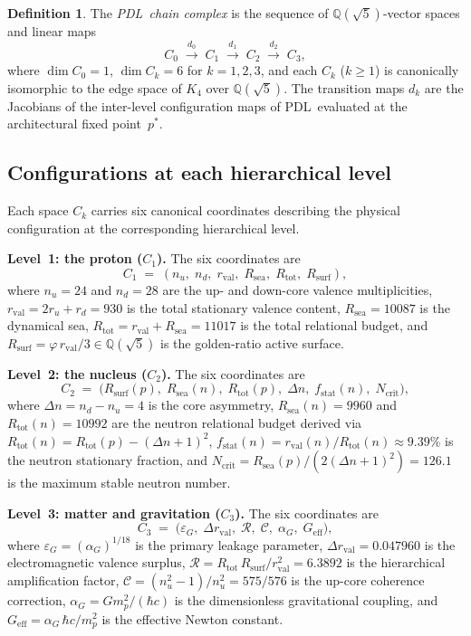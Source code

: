 \documentclass[11pt,a4paper]{article}
\theoremstyle{definition}
\newtheorem{definition}[theorem]{Definition}
\newcommand{\PDL}{\textnormal{PDL}}
\newcommand{\Rsurf}{R_{\mathrm{surf}}}
\newcommand{\Rsea}{R_{\mathrm{sea}}}
\newcommand{\Rtot}{R_{\mathrm{tot}}}
\newcommand{\rval}{r_{\mathrm{val}}}
\newcommand{\epsg}{\varepsilon_G}
\newcommand{\Kfour}{K_4}
\newcommand{\dmap}[1]{d_{#1}}
\newcommand{\calR}{\mathcal{R}}
\newcommand{\calC}{\mathcal{C}}
\newcommand{\vp}{\varphi}
\begin{document}
\begin{definition}
  \label{def:chain_complex}
  The \emph{\PDL\ chain complex} is the sequence of $\mathbb{Q}(\sqrt{5})$-vector spaces and linear maps
  \[
    C_0 \;\xrightarrow{\dmap{0}}\; C_1 \;\xrightarrow{\dmap{1}}\; C_2 \;\xrightarrow{\dmap{2}}\; C_3,
  \]
  where $\dim C_0 = 1$, $\dim C_k = 6$ for $k = 1, 2, 3$, and each $C_k$ ($k \geq 1$) is canonically isomorphic to the edge space of $\Kfour$ over $\mathbb{Q}(\sqrt{5})$. The transition maps $\dmap{k}$ are the Jacobians of the inter-level configuration maps of \PDL\ evaluated at the architectural fixed point~$p^*$.
\end{definition}

\subsection{Configurations at each hierarchical level}
\label{subsec:configs}

Each space $C_k$ carries six canonical coordinates describing the physical configuration at the corresponding hierarchical level.

\medskip\noindent\textbf{Level~1: the proton ($C_1$).} The six coordinates are
\[
  C_1 \;=\; (n_u,\; n_d,\; \rval,\; \Rsea,\; \Rtot,\; \Rsurf),
\]
where $n_u = 24$ and $n_d = 28$ are the up- and down-core valence multiplicities, $\rval = 2r_u + r_d = 930$ is the total stationary valence content, $\Rsea = 10087$ is the dynamical sea, $\Rtot = \rval + \Rsea = 11017$ is the total relational budget, and $\Rsurf = \vp\,\rval/3 \in \mathbb{Q}(\sqrt{5})$ is the golden-ratio active surface.\cite{Combinatorial_Proton_v2_2026,Alpha_PDL_v2_2026}

\medskip\noindent\textbf{Level~2: the nucleus ($C_2$).} The six coordinates are
\[
  C_2 \;=\; \bigl(\Rsurf(p),\; \Rsea(n),\; \Rtot(p),\; \Delta n,\; f_{\mathrm{stat}}(n),\; N_{\mathrm{crit}}\bigr),
\]
where $\Delta n = n_d - n_u = 4$ is the core asymmetry, $\Rsea(n) = 9960$ and $\Rtot(n) = 10992$ are the neutron relational budget derived via $\Rtot(n) = \Rtot(p) - (\Delta n+1)^2$,\cite{Nuclear_Stability_PDL_2026} $f_{\mathrm{stat}}(n) = \rval(n)/\Rtot(n) \approx 9.39\%$ is the neutron stationary fraction, and $N_{\mathrm{crit}} = \Rsea(p)/(2(\Delta n+1)^2) = 126.1$ is the maximum stable neutron number.

\medskip\noindent\textbf{Level~3: matter and gravitation ($C_3$).} The six coordinates are
\[
  C_3 \;=\; \bigl(\epsg,\; \Delta\rval,\; \calR,\; \calC,\; \alpha_G,\; G_{\mathrm{eff}}\bigr),
\]
where $\epsg = (\alpha_G)^{1/18}$ is the primary leakage parameter, $\Delta\rval = 0.047960$ is the electromagnetic valence surplus, $\calR = \Rtot\,\Rsurf/\rval^2 = 6.3892$ is the hierarchical amplification factor, $\calC = (n_u^2-1)/n_u^2 = 575/576$ is the up-core coherence correction, $\alpha_G = G m_p^2/(\hbar c)$ is the dimensionless gravitational coupling, and $G_{\mathrm{eff}} = \alpha_G\,\hbar c/m_p^2$ is the effective Newton constant.\cite{Bridge_Formula_PDL_2026}
\end{document}

